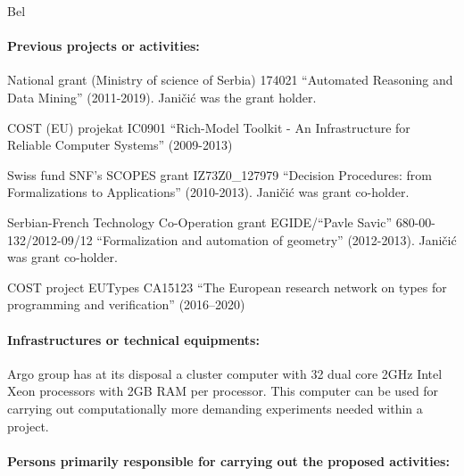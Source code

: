 \begin{sitedescription}{Bel}
  \paragraph*{Previous projects or activities:}
  
  \begin{compactitem}
  \item National grant (Ministry of science of Serbia) 174021
    ``Automated Reasoning and Data Mining'' (2011-2019). Janičić was
    the grant holder.
  \item COST (EU) projekat IC0901 ``Rich-Model Toolkit - An
    Infrastructure for Reliable Computer Systems'' (2009-2013)
  \item Swiss fund SNF's SCOPES grant IZ73Z0\_127979 ``Decision
    Procedures: from Formalizations to Applications''
    (2010-2013). Jani\v ci\'c was grant co-holder.
  \item Serbian-French Technology Co-Operation grant EGIDE/``Pavle
    Savic'' 680-00-132/2012-09/12 ``Formalization and automation of
    geometry'' (2012-2013). Jani\v ci\'c was grant co-holder.
  \item COST project EUTypes CA15123 ``The European research network on types for programming and verification'' (2016--2020) 
  \end{compactitem}

  \paragraph*{Infrastructures or technical equipments:}

  \begin{compactitem}
  \item Argo group has at its disposal a cluster computer with 32 dual core
  2GHz Intel Xeon processors with 2GB RAM per processor. This computer
  can be used for carrying out computationally more demanding
  experiments needed within a project.
  \end{compactitem}
  
  \paragraph*{Persons primarily responsible for carrying out the proposed activities:}
  
  \begin{compactitem} %
    

\end{compactitem}
\end{sitedescription}
